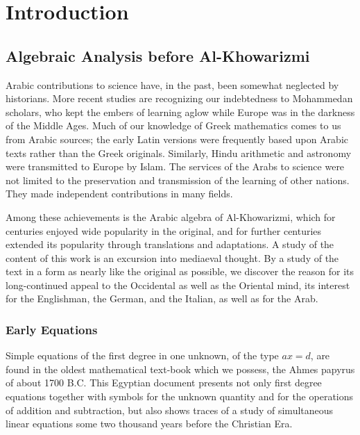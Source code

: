 \documentclass[11pt,a4paper]{book}
\begin{document}
\part{Introduction}

\chapter{Algebraic Analysis before Al-Khowarizmi}

Arabic contributions to science have, in the past, been somewhat neglected by historians. More recent studies are recognizing our indebtedness to Mohammedan scholars, who kept the embers of learning aglow while Europe was in the darkness of the Middle Ages. Much of our knowledge of Greek mathematics comes to us from Arabic sources; the early Latin versions were frequently based upon Arabic texts rather than the Greek originals. Similarly, Hindu arithmetic and astronomy were transmitted to Europe by Islam. The services of the Arabs to science were not limited to the preservation and transmission of the learning of other nations. They made independent contributions in many fields.

Among these achievements is the Arabic algebra of Al-Khowarizmi, which for centuries enjoyed wide popularity in the original, and for further centuries extended its popularity through translations and adaptations. A study of the content of this work is an excursion into mediaeval thought. By a study of the text in a form as nearly like the original as possible, we discover the reason for its long-continued appeal to the Occidental as well as the Oriental mind, its interest for the Englishman, the German, and the Italian, as well as for the Arab.

\section{Early Equations}

Simple equations of the first degree in one unknown, of the type $ax = d$, are found in the oldest mathematical text-book which we possess, the Ahmes papyrus of about 1700 B.C. This Egyptian document presents not only first degree equations together with symbols for the unknown quantity and for the operations of addition and subtraction, but also shows traces of a study of simultaneous linear equations some two thousand years before the Christian Era.
\end{document}
